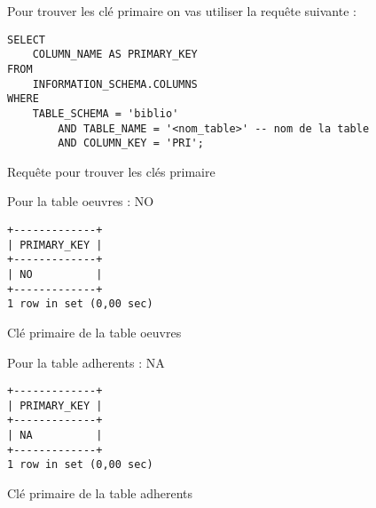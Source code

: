 \documentclass{article}
\begin{document}
Pour trouver les clé primaire on vas utiliser la requête suivante :

\begin{center}
\begin{minipage}{0.8\linewidth}
\begin{listing}[H]
\begin{verbatim}
SELECT 
    COLUMN_NAME AS PRIMARY_KEY
FROM
    INFORMATION_SCHEMA.COLUMNS
WHERE
    TABLE_SCHEMA = 'biblio'
        AND TABLE_NAME = '<nom_table>' -- nom de la table
        AND COLUMN_KEY = 'PRI';
\end{verbatim}
	\caption{Requête pour trouver les clés primaire}
\end{listing}	
\end{minipage}
\end{center}

\vspace*{20pt}
\begin{minipage}{0.4\linewidth}
Pour la table oeuvres : NO
\begin{listing}[H]
\begin{verbatim}
+-------------+
| PRIMARY_KEY |
+-------------+
| NO          |
+-------------+
1 row in set (0,00 sec)
\end{verbatim}
	\caption{Clé primaire de la table oeuvres}
\end{listing}
\end{minipage}\hfill
\begin{minipage}{0.4\linewidth}
Pour la table adherents : NA
\begin{listing}[H]
\begin{verbatim}
+-------------+
| PRIMARY_KEY |
+-------------+
| NA          |
+-------------+
1 row in set (0,00 sec)
\end{verbatim}
	\caption{Clé primaire de la table adherents}
\end{listing}
\end{minipage}
\end{document}
